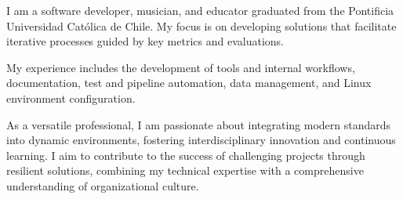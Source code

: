 

\begin{cvparagraph}

    I am a software developer, musician, and educator graduated from the
    Pontificia Universidad Católica de Chile. My focus is on developing
    solutions that facilitate iterative processes guided by key metrics and
    evaluations.

    My experience includes the development of tools and internal workflows,
    documentation, test and pipeline automation, data management, and Linux
    environment configuration.

    As a versatile professional, I am passionate about integrating modern
    standards into dynamic environments, fostering interdisciplinary innovation
    and continuous learning. I aim to contribute to the success of challenging
    projects through resilient solutions, combining my technical expertise with
    a comprehensive understanding of organizational culture.

\end{cvparagraph}

